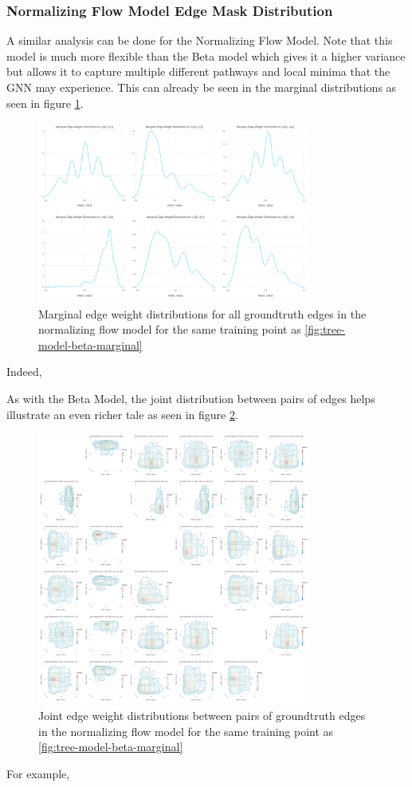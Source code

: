 \subsubsection{Normalizing Flow Model Edge Mask Distribution}
A similar analysis can be done for the Normalizing Flow Model. Note that this model is much more flexible than the Beta model which gives it a higher variance but allows it to capture multiple different pathways and local minima that the GNN may experience. This can already be seen in the marginal distributions as seen in figure \ref{fig:tree-model-dnfg-marginal}.
\begin{figure}[H]
	\centering
	\includegraphics[width=0.8\textwidth]{images/tree-model-dnfg-marginal.pdf}
	\caption{Marginal edge weight distributions for all groundtruth edges in the normalizing flow model for the same training point as \ref{fig:tree-model-beta-marginal}}
	\label{fig:tree-model-dnfg-marginal}
\end{figure}

Indeed, 

As with the Beta Model, the joint distribution between pairs of edges helps illustrate an even richer tale as seen in figure \ref{fig:tree-model-dnfg-joint}.
\begin{figure}[H]
	\centering
	\includegraphics[width=0.8\textwidth]{images/tree-model-dnfg-joint.pdf}
	\caption{Joint edge weight distributions between pairs of groundtruth edges in the normalizing flow model for the same training point as \ref{fig:tree-model-beta-marginal}}
	\label{fig:tree-model-dnfg-joint}
\end{figure}

For example,

\newpage
